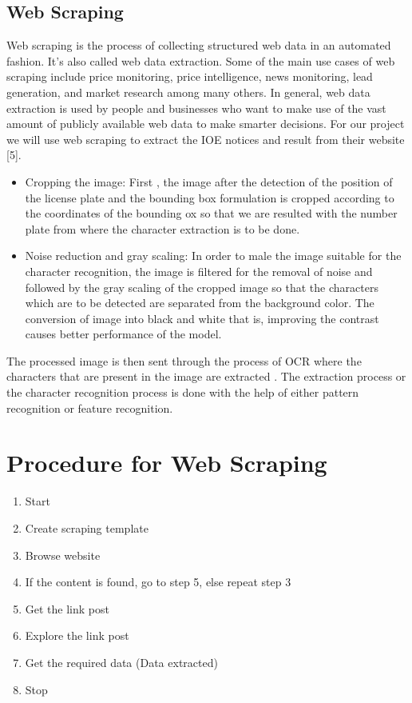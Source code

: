 \subsection*{ Web Scraping}
Web scraping is the process of collecting structured web data in an automated fashion. 
It’s also called web data extraction. Some of the main use cases of web scraping include 
price monitoring, price intelligence, news monitoring, lead generation, and market 
research among many others. In general, web data extraction is used by people and 
businesses who want to make use of the vast amount of publicly available web data to 
make smarter decisions. For our project we will use web scraping to extract the IOE 
notices and result from their website [5].
\begin{itemize}
	\item Cropping the image: First , the image after the detection of the position of the license plate and the bounding box formulation is cropped according to the coordinates of the bounding ox so that we are resulted with  the number plate from where the character extraction is to be done.
	\item Noise reduction and gray scaling: In order to male the image suitable for the character recognition, the image is filtered for the removal of noise and followed by the gray scaling of the cropped image so that the characters which are to be detected are separated from the background color. The conversion of image into black and white that is, improving the contrast causes better performance of the model.
\end{itemize}
The processed image is then sent through the process of OCR where the characters that are present in the image are extracted . The extraction process or the character recognition process is done with the help of either pattern recognition or feature recognition.
\section*{Procedure for Web Scraping}
\begin{enumerate}
\item Start
\item Create scraping template
\item Browse website
\item If the content is found, go to step 5, else repeat step 3
\item Get the link post
\item Explore the link post
\item Get the required data (Data extracted)
\item Stop
\end{enumerate}
\newpage
